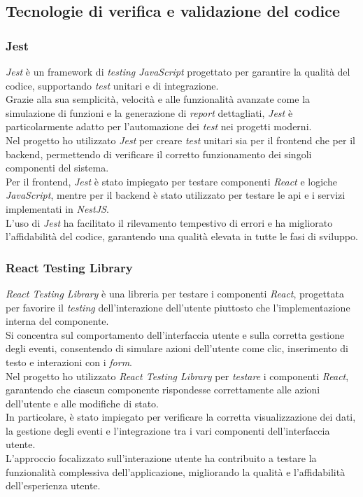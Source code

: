 \subsection{Tecnologie di verifica e validazione del codice}
\label{sez:tecnologie-validazione-codice}

\subsubsection{Jest}

\textit{Jest} è un framework di \textit{testing JavaScript} progettato per garantire la qualità del codice, supportando \textit{test} unitari e di integrazione.\\
Grazie alla sua semplicità, velocità e alle funzionalità avanzate come la simulazione di funzioni e la generazione di \textit{report} dettagliati, \textit{Jest} è particolarmente adatto per l'automazione dei \textit{test} nei progetti moderni.\\

\noindent Nel progetto ho utilizzato \textit{Jest} per creare \textit{test} unitari sia per il \gls{frontend} che per il \gls{backend}, permettendo di verificare il corretto funzionamento dei singoli componenti del sistema.\\
Per il \gls{frontend}, \textit{Jest} è stato impiegato per testare componenti \textit{React} e logiche  \textit{JavaScript}, mentre per il \gls{backend} è stato utilizzato per testare le \gls{api} e i servizi implementati in \textit{NestJS}.\\
L'uso di \textit{Jest} ha facilitato il rilevamento tempestivo di errori e ha migliorato l'affidabilità del codice, garantendo una qualità elevata in tutte le fasi di sviluppo.

\subsubsection{React Testing Library}
\textit{React Testing Library} è una libreria per testare i componenti \textit{React}, progettata per favorire il \textit{testing} dell'interazione dell'utente piuttosto che l'implementazione interna del componente. \\
Si concentra sul comportamento dell'interfaccia utente e sulla corretta gestione degli eventi, consentendo di simulare azioni dell'utente come clic, inserimento di testo e interazioni con i \textit{form}.\\

\noindent Nel progetto ho utilizzato \textit{React Testing Library} per \textit{testare} i componenti \textit{React}, garantendo che ciascun componente rispondesse correttamente alle azioni dell'utente e alle modifiche di stato. \\
In particolare, è stato impiegato per verificare la corretta visualizzazione dei dati, la gestione degli eventi e l'integrazione tra i vari componenti dell'interfaccia utente.\\ 
L'approccio focalizzato sull'interazione utente ha contribuito a testare la funzionalità complessiva dell'applicazione, migliorando la qualità e l'affidabilità dell'esperienza utente.

